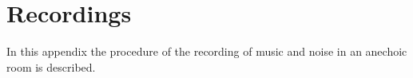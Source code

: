 \chapter{Recordings} \label{recordings}
In this appendix the procedure of the recording of music and noise in an anechoic room is described.


